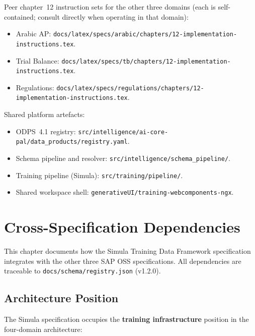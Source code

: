 \documentclass[12pt,a4paper,twoside]{report}
\begin{document}
Peer chapter~12 instruction sets for the other three domains (each
is self-contained; consult directly when operating in that domain):
\begin{itemize}
\item Arabic AP:
\texttt{docs/latex/specs/arabic/chapters/12-implementation-instructions.tex}.
\item Trial Balance:
\texttt{docs/latex/specs/tb/chapters/12-implementation-instructions.tex}.
\item Regulations:
\texttt{docs/latex/specs/regulations/chapters/12-implementation-instructions.tex}.
\end{itemize}

Shared platform artefacts:
\begin{itemize}
\item ODPS~4.1 registry:
\texttt{src/intelligence/ai-core-pal/data\_products/registry.yaml}.
\item Schema pipeline and resolver:
\texttt{src/intelligence/schema\_pipeline/}.
\item Training pipeline (Simula):
\texttt{src/training/pipeline/}.
\item Shared workspace shell:
\texttt{generativeUI/training-webcomponents-ngx}.
\end{itemize}

\chapter{Cross-Specification Dependencies}
\label{ch:cross-spec}

This chapter documents how the Simula Training Data Framework specification
integrates with the other three SAP OSS specifications. All dependencies
are traceable to \texttt{docs/schema/registry.json} (v1.2.0).

\section{Architecture Position}
\label{sec:arch-position}

The Simula specification occupies the \textbf{training infrastructure} position
in the four-domain architecture:
\end{document}
